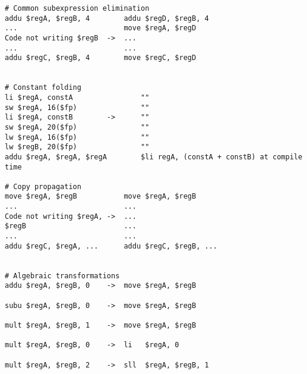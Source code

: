 \documentclass[10pt,a4paper]{article}
\begin{document}
\begin{verbatim}
# Common subexpression elimination
addu $regA, $regB, 4        addu $regD, $regB, 4
...                         move $regA, $regD
Code not writing $regB  ->  ...
...                         ...
addu $regC, $regB, 4        move $regC, $regD


# Constant folding
li $regA, constA                ""       
sw $regA, 16($fp)               ""
li $regA, constB        ->      ""
sw $regA, 20($fp)               ""	
lw $regA, 16($fp)               "" 
lw $regB, 20($fp)               ""
addu $regA, $regA, $regA        $li regA, (constA + constB) at compile time

# Copy propagation
move $regA, $regB           move $regA, $regB
...                         ...
Code not writing $regA, ->  ...
$regB                       ...
...                         ...
addu $regC, $regA, ...      addu $regC, $regB, ...


# Algebraic transformations
addu $regA, $regB, 0    ->  move $regA, $regB

subu $regA, $regB, 0    ->  move $regA, $regB

mult $regA, $regB, 1    ->  move $regA, $regB

mult $regA, $regB, 0    ->  li   $regA, 0

mult $regA, $regB, 2    ->  sll  $regA, $regB, 1
\end{verbatim}
\end{document}
